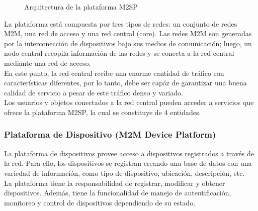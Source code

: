\documentclass[journal]{IEEEtran}
\begin{document}
\begin{figure}[h]
\centering
{}
\caption{Arquitectura de la plataforma M2SP}
\label{arqM2SP}
\end{figure}

La plataforma está compuesta por tres tipos de redes: un conjunto de redes M2M, una red de acceso y una red central (core). Las redes M2M son generadas por la interconección de dispositivos bajo sus medios de comunicación; luego, un nodo central recopila información de las redes y se conecta a la red central mediante una red de acceso.\\

En este punto, la red central recibe una enorme cantidad de tráfico con características diferentes, por lo tanto, debe ser capáz de garantizar una buena calidad de servicio a pesar de este tráfico denso y variado.\\

Los usuarios y objetos conectados a la red central pueden acceder a servicios que ofrece la plataforma M2SP, la cual se constituye de 4 entidades.\\

\subsubsection{Plataforma de Dispositivo (M2M Device Platform)}


La plataforma de dispositivos provee acceso a dispositivos registrados a través de la red. Para ello, los dispositivos se registran creando una base de datos con una variedad de información, como tipo de dispositivo, ubicación, descripción, etc.\\
La plataforma tiene la responsabilidad de registrar, modificar y obtener dispositivos. Además, tiene la funcionalidad de manejo de autentificación, monitoreo y control de dispositivos dependiendo de su estado.\\
\end{document}
